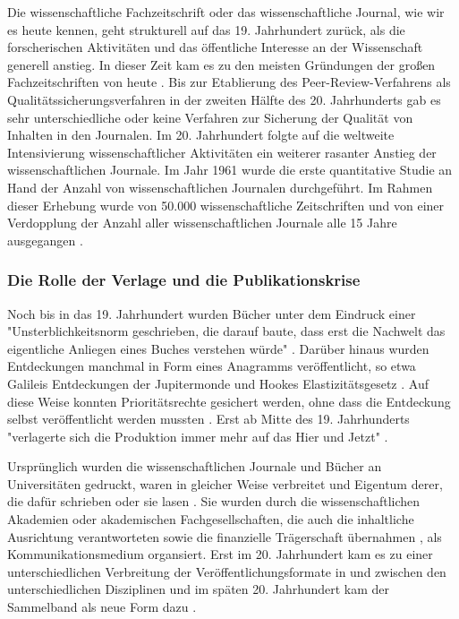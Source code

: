 Die wissenschaftliche Fachzeitschrift oder das wissenschaftliche Journal, wie wir es heute kennen, geht strukturell auf das 19. Jahrhundert zurück, als die forscherischen Aktivitäten und das öffentliche Interesse an der Wissenschaft generell anstieg. In dieser Zeit kam es zu den meisten Gründungen der großen Fachzeitschriften von heute \cite{porter_1964_scientific}. Bis zur Etablierung des Peer-Review-Verfahrens als Qualitätssicherungsverfahren in der zweiten Hälfte des 20. Jahrhunderts gab es sehr unterschiedliche oder keine Verfahren zur Sicherung der Qualität von Inhalten in den Journalen. Im 20. Jahrhundert folgte auf die weltweite Intensivierung wissenschaftlicher Aktivitäten ein weiterer rasanter Anstieg der wissenschaftlichen Journale. Im Jahr 1961 wurde die erste quantitative Studie an Hand der Anzahl von wissenschaftlichen Journalen durchgeführt. Im Rahmen dieser Erhebung wurde von 50.000 wissenschaftliche Zeitschriften und von einer Verdopplung der Anzahl aller wissenschaftlichen Journale alle 15 Jahre ausgegangen \cite{de_1982_little}.

\subsubsection{Die Rolle der Verlage und die Publikationskrise}

Noch bis in das 19. Jahrhundert wurden Bücher unter dem Eindruck einer "Unsterblichkeitsnorm geschrieben, die darauf baute, dass erst die Nachwelt das eigentliche Anliegen eines Buches verstehen würde" \cite{hagner_2015_sache_buches}. Darüber hinaus wurden Entdeckungen manchmal in Form eines Anagramms veröffentlicht, so etwa Galileis Entdeckungen der Jupitermonde \cite{miner2007discovery} und Hookes Elastizitätsgesetz \cite{szabo_2013_geschichte}. Auf diese Weise konnten Prioritätsrechte gesichert werden, ohne dass die Entdeckung selbst veröffentlicht werden mussten \cite{miner2007discovery}. Erst ab Mitte des 19. Jahrhunderts "verlagerte sich die Produktion immer mehr auf das Hier und Jetzt" \cite{hagner_2015_sache_buches}.

Ursprünglich wurden die wissenschaftlichen Journale und Bücher an Universitäten gedruckt, waren in gleicher Weise verbreitet \cite{hagner_2015_sache_buches} und Eigentum derer, die dafür schrieben oder sie lasen \cite{epaa_Weiner_2001}. Sie wurden durch die wissenschaftlichen Akademien oder akademischen Fachgesellschaften, die auch die inhaltliche Ausrichtung verantworteten sowie die finanzielle Trägerschaft übernahmen \cite{suchen}, als Kommunikationsmedium organsiert. Erst im 20. Jahrhundert kam es zu einer unterschiedlichen Verbreitung der Veröffentlichungsformate in und zwischen den unterschiedlichen Disziplinen und im späten 20. Jahrhundert kam der Sammelband als neue Form dazu \cite{hagner_2015_sache_buches}.

